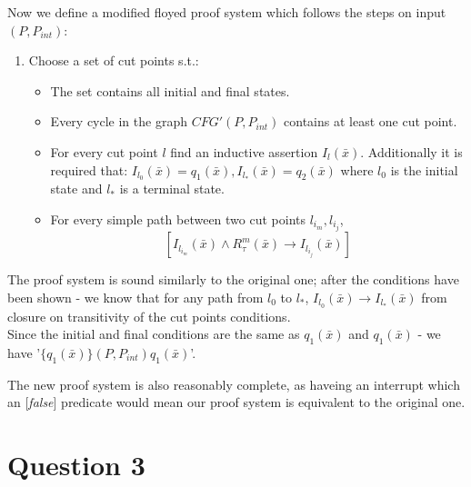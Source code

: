 \documentclass{article}
\begin{document}
Now we define a modified floyed proof system which follows the steps
on input $(P,P_{int})$:
\begin{enumerate}
    \item Choose a set of cut points s.t.:
    \begin{itemize}
        \item The set contains all initial and final states.
        \item Every cycle in the graph $CFG'(P,P_{int})$ contains at least one cut point.
        \item For every cut point $l$ find an inductive assertion $I_l(\bar{x})$.
            Additionally it is required that: $I_{l_0}(\bar{x}) = q_1(\bar{x}), I_{l_*}(\bar{x}) = q_2(\bar{x})$ where $l_0$
            is the initial state and $l_*$ is a terminal state.
        \item For every simple path between two cut points $l_{i_m}, l_{i_j}$,
        \[
            [I_{l_{i_m}}(\bar{x})\wedge R^m_\tau(\bar{x})\rightarrow I_{l_{i_j}}(\bar{x})]
        \]
    \end{itemize}
\end{enumerate}

The proof system is sound similarly to the original one; 
after the conditions have been shown - we know that for any path from
$l_0$ to $l_*$, $I_{l_0}(\bar{x})\rightarrow I_{l_*}(\bar{x})$ from closure on transitivity
of  the cut points conditions.\\
Since the initial and final conditions are the same as $q_1(\bar{x})$ and $q_1(\bar{x})$ -
we have '$\{q_1(\bar{x})\}(P,P_{int})q_1(\bar{x})$'.

The new proof system is also reasonably complete, as haveing an interrupt which an [\emph{false}]
predicate would mean our proof system is equivalent to the original one.

\section*{Question 3}
\end{document}

